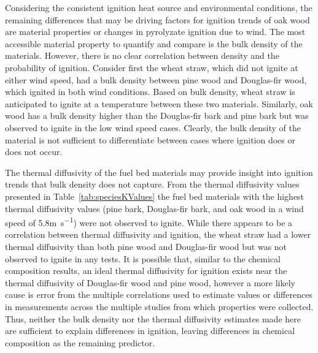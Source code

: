     Considering the consistent ignition heat source and environmental conditions, the remaining differences that may be driving factors for ignition trends of oak wood are material properties or changes in pyrolyzate ignition due to wind. The most accessible material property to quantify and compare is the bulk density of the materials. However, there is no clear correlation between density and the probability of ignition. Consider first the wheat straw, which did not ignite at either wind speed, had a bulk density between pine wood and Douglas-fir wood, which ignited in both wind conditions. Based on bulk density, wheat straw is anticipated to ignite at a temperature between these two materials. Similarly, oak wood has a bulk density higher than the Douglas-fir bark and pine bark but was observed to ignite in the low wind speed cases. Clearly, the bulk density of the material is not sufficient to differentiate between cases where ignition does or does not occur. 
    
    The thermal diffusivity of the fuel bed materials may provide insight into ignition trends that bulk density does not capture. From the thermal diffusivity values presented in Table~\ref{tab:speciesKValues} the fuel bed materials with the highest thermal diffusivity values (pine bark, Douglas-fir bark, and oak wood in a wind speed of 5.8\si{\meter\per\second}) were not observed to ignite. While there appears to be a correlation between thermal diffusivity and ignition, the wheat straw had a lower thermal diffusivity than both pine wood and Douglas-fir wood but was not observed to ignite in any tests. It is possible that, similar to the chemical composition results, an ideal thermal diffusivity for ignition exists near the thermal diffusivity of Douglas-fir wood and pine wood, however a more likely cause is error from the multiple correlations used to estimate values or differences in measurements across the multiple studies from which properties were collected. Thus, neither the bulk density nor the thermal diffusivity estimates made here are sufficient to explain differences in ignition, leaving differences in chemical composition as the remaining predictor.  
    
